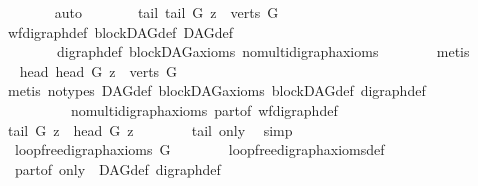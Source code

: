 \begin{isabellebody}
\ \ \ \ \ \ \isamarkupfalse%
\ auto\isanewline
\ \ \ \ \isamarkupfalse%
\ \isamarkupfalse%
\ tail{\isacharcolon}{\kern0pt}\ {\isachardoublequoteopen}tail\ G\ z\ {\isasymin}\ verts\ G{\isachardoublequoteclose}\isanewline
\ \ \ \ \ \ \isamarkupfalse%
\ wf{\isacharunderscore}{\kern0pt}digraph{\isacharunderscore}{\kern0pt}def\ blockDAG{\isacharunderscore}{\kern0pt}def\ DAG{\isacharunderscore}{\kern0pt}def\ \isanewline
\ \ \ \ \ \ \ \ digraph{\isacharunderscore}{\kern0pt}def\ blockDAG{\isacharunderscore}{\kern0pt}axioms\ nomulti{\isacharunderscore}{\kern0pt}digraph{\isachardot}{\kern0pt}axioms{\isacharparenleft}{\kern0pt}{}{\isacharparenright}{\kern0pt}\isanewline
\ \ \ \ \ \ \isamarkupfalse%
\ metis\isanewline
\ \ \ \ \isamarkupfalse%
\ \isamarkupfalse%
\ head{\isacharcolon}{\kern0pt}\ {\isachardoublequoteopen}head\ G\ z\ {\isasymin}\ verts\ G{\isachardoublequoteclose}\ \isanewline
\ \ \ \ \ \ \isamarkupfalse%
\ {\isacharparenleft}{\kern0pt}metis\ {\isacharparenleft}{\kern0pt}no{\isacharunderscore}{\kern0pt}types{\isacharparenright}{\kern0pt}\ DAG{\isacharunderscore}{\kern0pt}def\ blockDAG{\isacharunderscore}{\kern0pt}axioms\ blockDAG{\isacharunderscore}{\kern0pt}def\ digraph{\isacharunderscore}{\kern0pt}def\isanewline
\ \ \ \ \ \ \ \ \ \ nomulti{\isacharunderscore}{\kern0pt}digraph{\isachardot}{\kern0pt}axioms{\isacharparenleft}{\kern0pt}{}{\isacharparenright}{\kern0pt}\ part{\isacharunderscore}{\kern0pt}of\ wf{\isacharunderscore}{\kern0pt}digraph{\isacharunderscore}{\kern0pt}def{\isacharparenright}{\kern0pt}\isanewline
\ \ \ \ \isamarkupfalse%
\ \isamarkupfalse%
\ {\isachardoublequoteopen}tail\ G\ z\ {\isacharequal}{\kern0pt}\ head\ G\ z{\isachardoublequoteclose}\isanewline
\ \ \ \ \ \ \isamarkupfalse%
\ tail\ only\ \isamarkupfalse%
\ simp\isanewline
\ \ \ \ \isamarkupfalse%
\ \isamarkupfalse%
\ {\isachardoublequoteopen}{\isasymnot}\ loopfree{\isacharunderscore}{\kern0pt}digraph{\isacharunderscore}{\kern0pt}axioms\ G{\isachardoublequoteclose}\isanewline
\ \ \ \ \ \ \isamarkupfalse%
\ loopfree{\isacharunderscore}{\kern0pt}digraph{\isacharunderscore}{\kern0pt}axioms{\isacharunderscore}{\kern0pt}def\isanewline
\ \ \ \ \ \ \isamarkupfalse%
\ \ part{\isacharunderscore}{\kern0pt}of\ only\ \ DAG{\isacharunderscore}{\kern0pt}def\ digraph{\isacharunderscore}{\kern0pt}def\isanewline

\end{isabellebody}
